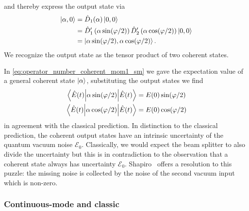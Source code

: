 and thereby express the output state via
\begin{align}
    \ket{\alpha,0}
    &=
    \hat{D}_1(\alpha)
    \ket{0,0}
    \\
    &=
    \hat{D}^\prime_1\left(\alpha\sin(\varphi/2)\right)
    \hat{D}^\prime_2\left(\alpha\cos(\varphi/2)\right)
    \ket{0,0}
    \\
    &=
    \ket{\alpha\sin(\varphi/2),\alpha\cos(\varphi/2)}
    .
\end{align}
We recognize the output state as the tensor product of two coherent states.

In \cref{eq:operator_number_coherent_mom1_sm} we gave the expectation value of a general coherent state $\ket{\alpha}$, substituting the output states we find
\begin{align}
    \expval{\alpha\sin(\varphi/2)}{\hat{E}(t)}
    &=
    E(0)\sin(\varphi/2)
    \\
    \expval{\alpha\cos(\varphi/2)}{\hat{E}(t)}
    &=
    E(0)\cos(\varphi/2)
\end{align}
in agreement with the classical prediction.
In distinction to the classical prediction, the coherent output states have an intrinsic uncertainty of the quantum vacuum noise $\mathcal{E}_0$.
Classically, we would expect the beam splitter to also divide the uncertainty but this is in contradiction to the observation that a coherent state always has uncertainty $\mathcal{E}_0$.
Shapiro~\cite{Shapiro2009} offers a resolution to this puzzle: the missing noise is collected by the noise of the second vacuum input which is non-zero.

\subsubsection{Continuous-mode and classic}

